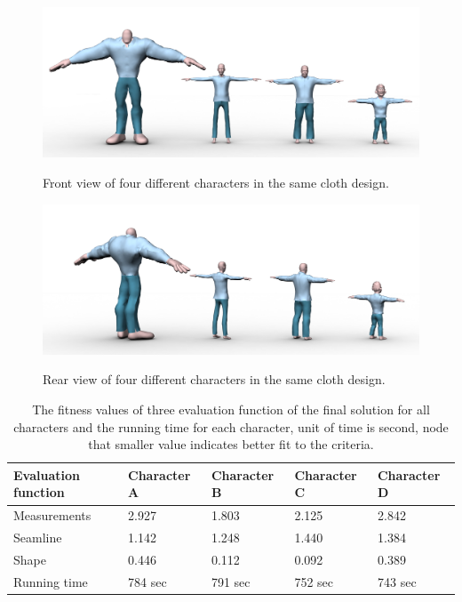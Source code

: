 \begin{figure}[H]
	\centering
	\includegraphics[width=1.0\columnwidth]{../images/all_characters_with_cloth}\\[0.1cm]
    \caption[Front view of dressed up characters]{Front view of four different characters in the same cloth design.}
    \label{figure:final_result_front}
\end{figure}

\begin{figure}[H]
	\centering
	\includegraphics[width=1.0\columnwidth]{../images/all_characters_with_cloth2}\\[0.1cm]
    \caption[Rear view of dressed up characters]{Rear view of four different characters in the same cloth design.}
    \label{figure:final_result_back}
\end{figure}



\begin{table}[H]
    \centering
    \small
    \begin{tabular}{|p{2.2cm}|p{2cm}|p{2cm}|p{2cm}|p{2cm}|}
        \hline
        Evaluation function  & Character A & Character B & Character C & Character D\\
        \hline
        Measurements & 2.927 & 1.803 & 2.125 & 2.842\\
        \hline
        Seamline  & 1.142	&  1.248 &	1.440 & 1.384\\
        \hline
        Shape & 0.446 & 0.112 & 0.092 & 0.389\\
        \hline
        Running time & 784 sec & 791 sec & 752 sec & 743 sec \\
        \hline
    \end{tabular}
    \caption[Fitness values of the final solution]{The fitness values of three evaluation function of the final solution for all characters and the running time for each character, unit of time is second, node that smaller value indicates better fit to the criteria.}
    \label{table:GA_errors}
\end{table}
\setlength{\tabcolsep}{6pt}

